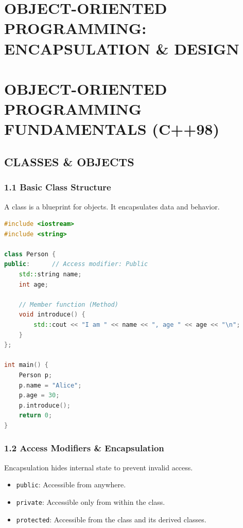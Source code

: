 \hypertarget{object-oriented-programming-encapsulation-design}{%
\chapter{OBJECT-ORIENTED PROGRAMMING: ENCAPSULATION \&
DESIGN}\label{object-oriented-programming-encapsulation-design}}

\hypertarget{object-oriented-programming-fundamentals-c98}{%
\chapter{OBJECT-ORIENTED PROGRAMMING FUNDAMENTALS
(C++98)}\label{object-oriented-programming-fundamentals-c98}}

\hypertarget{classes-objects}{%
\section{CLASSES \& OBJECTS}\label{classes-objects}}

\hypertarget{basic-class-structure}{%
\subsection{1.1 Basic Class Structure}\label{basic-class-structure}}

A class is a blueprint for objects. It encapsulates data and behavior.

\begin{lstlisting}[language={C++}]
#include <iostream>
#include <string>

class Person {
public:      // Access modifier: Public
    std::string name;
    int age;
    
    // Member function (Method)
    void introduce() {
        std::cout << "I am " << name << ", age " << age << "\n";
    }
};

int main() {
    Person p;
    p.name = "Alice";
    p.age = 30;
    p.introduce();
    return 0;
}
\end{lstlisting}

\hypertarget{access-modifiers-encapsulation}{%
\subsection{1.2 Access Modifiers \&
Encapsulation}\label{access-modifiers-encapsulation}}

Encapsulation hides internal state to prevent invalid access.

\begin{itemize}
\tightlist
\item
  \passthrough{\lstinline!public!}: Accessible from anywhere.
\item
  \passthrough{\lstinline!private!}: Accessible only from within the
  class.
\item
  \passthrough{\lstinline!protected!}: Accessible from the class and its
  derived classes.
\end{itemize}

